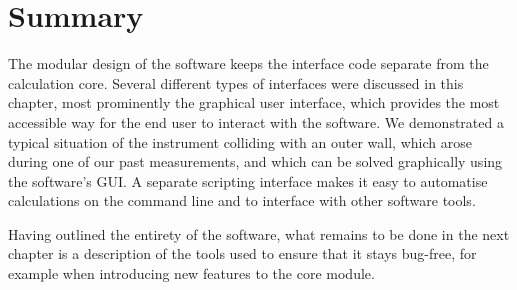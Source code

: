 \section{Summary}
The modular design of the software keeps the interface code separate from the calculation core.
Several different types of interfaces were discussed in this chapter, most prominently the graphical 
user interface, which provides the most accessible way for the end user to interact with the software.
We demonstrated a typical situation of the instrument colliding with an outer wall, which arose 
during one of our past measurements, and which can be solved graphically using the software's GUI.
A separate scripting interface makes it easy to automatise calculations on the command line and 
to interface with other software tools.

Having outlined the entirety of the software, what remains to be done in the next chapter
is a description of the tools used to ensure that it stays bug-free, for example when
introducing new features to the core module.
